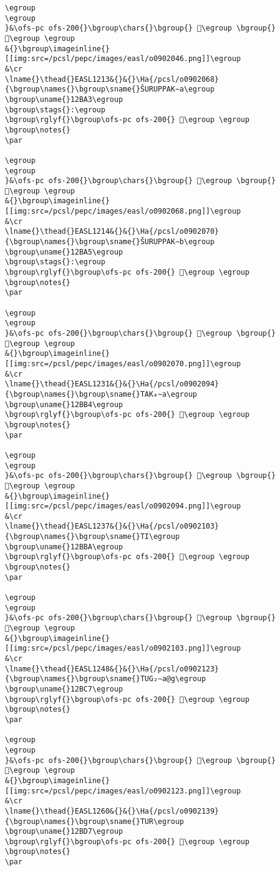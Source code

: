 \begin{verbatim}
\egroup
\egroup
}&\ofs-pc ofs-200{}\bgroup\chars{}\bgroup{} 𒮓\egroup \bgroup{} 𒮔\egroup \egroup
&{}\bgroup\imageinline{}[[img:src=/pcsl/pepc/images/easl/o0902046.png]]\egroup
&\cr
\lname{}\thead{}EASL1213&{}&{}\Ha{/pcsl/o0902068}{\bgroup\names{}\bgroup\sname{}ŠURUPPAK∼a\egroup
\bgroup\uname{}12BA3\egroup
\bgroup\stags{}:\egroup
\bgroup\rglyf{}\bgroup\ofs-pc ofs-200{} 𒮣\egroup \egroup
\bgroup\notes{}
\par 

\egroup
\egroup
}&\ofs-pc ofs-200{}\bgroup\chars{}\bgroup{} 𒮢\egroup \bgroup{} 𒮣\egroup \egroup
&{}\bgroup\imageinline{}[[img:src=/pcsl/pepc/images/easl/o0902068.png]]\egroup
&\cr
\lname{}\thead{}EASL1214&{}&{}\Ha{/pcsl/o0902070}{\bgroup\names{}\bgroup\sname{}ŠURUPPAK∼b\egroup
\bgroup\uname{}12BA5\egroup
\bgroup\stags{}:\egroup
\bgroup\rglyf{}\bgroup\ofs-pc ofs-200{} 𒮥\egroup \egroup
\bgroup\notes{}
\par 

\egroup
\egroup
}&\ofs-pc ofs-200{}\bgroup\chars{}\bgroup{} 𒮤\egroup \bgroup{} 𒮥\egroup \egroup
&{}\bgroup\imageinline{}[[img:src=/pcsl/pepc/images/easl/o0902070.png]]\egroup
&\cr
\lname{}\thead{}EASL1231&{}&{}\Ha{/pcsl/o0902094}{\bgroup\names{}\bgroup\sname{}TAK₄∼a\egroup
\bgroup\uname{}12BB4\egroup
\bgroup\rglyf{}\bgroup\ofs-pc ofs-200{} 𒮴\egroup \egroup
\bgroup\notes{}
\par 

\egroup
\egroup
}&\ofs-pc ofs-200{}\bgroup\chars{}\bgroup{} 𒮶\egroup \bgroup{} 𒮴\egroup \egroup
&{}\bgroup\imageinline{}[[img:src=/pcsl/pepc/images/easl/o0902094.png]]\egroup
&\cr
\lname{}\thead{}EASL1237&{}&{}\Ha{/pcsl/o0902103}{\bgroup\names{}\bgroup\sname{}TI\egroup
\bgroup\uname{}12BBA\egroup
\bgroup\rglyf{}\bgroup\ofs-pc ofs-200{} 𒮺\egroup \egroup
\bgroup\notes{}
\par 

\egroup
\egroup
}&\ofs-pc ofs-200{}\bgroup\chars{}\bgroup{} 𒮺\egroup \bgroup{} 𒮾\egroup \egroup
&{}\bgroup\imageinline{}[[img:src=/pcsl/pepc/images/easl/o0902103.png]]\egroup
&\cr
\lname{}\thead{}EASL1248&{}&{}\Ha{/pcsl/o0902123}{\bgroup\names{}\bgroup\sname{}TUG₂∼a@g\egroup
\bgroup\uname{}12BC7\egroup
\bgroup\rglyf{}\bgroup\ofs-pc ofs-200{} 𒯇\egroup \egroup
\bgroup\notes{}
\par 

\egroup
\egroup
}&\ofs-pc ofs-200{}\bgroup\chars{}\bgroup{} 𒯆\egroup \bgroup{} 𒯇\egroup \egroup
&{}\bgroup\imageinline{}[[img:src=/pcsl/pepc/images/easl/o0902123.png]]\egroup
&\cr
\lname{}\thead{}EASL1260&{}&{}\Ha{/pcsl/o0902139}{\bgroup\names{}\bgroup\sname{}TUR\egroup
\bgroup\uname{}12BD7\egroup
\bgroup\rglyf{}\bgroup\ofs-pc ofs-200{} 𒯗\egroup \egroup
\bgroup\notes{}
\par 


\end{verbatim}
